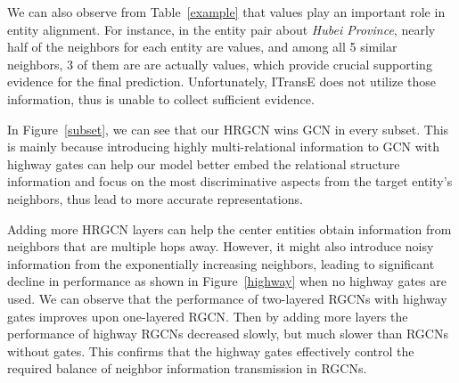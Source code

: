 	We can also observe from Table~\ref{example} that values play an important role in entity alignment.
	For instance, in the entity pair about \textit{Hubei Province}, nearly half of the neighbors for each entity are values, and among all 5 similar neighbors, 3 of them are are actually values,
	which provide crucial supporting evidence for the final prediction. Unfortunately, ITransE does not utilize those information, thus is unable to collect sufficient evidence.

	
	In Figure~\ref{subset}, we can see that our HRGCN wins GCN in every subset.
	This is mainly because introducing highly multi-relational information to GCN with highway gates can help our model better embed the relational structure information and focus on the most discriminative aspects from the target entity's neighbors, thus lead to more accurate representations.
		
	

	Adding more HRGCN layers can help the center entities obtain information from neighbors that are multiple hops away. However, it might also introduce noisy information from the exponentially increasing neighbors, leading to significant decline in performance as shown in Figure~\ref{highway} when no highway gates are used. We can observe that the performance of two-layered RGCNs with highway gates improves upon one-layered RGCN. Then by adding more layers the performance of highway RGCNs decreased slowly, but much slower than RGCNs without gates. This confirms that the highway gates effectively control the required balance of neighbor information transmission in RGCNs.
	

